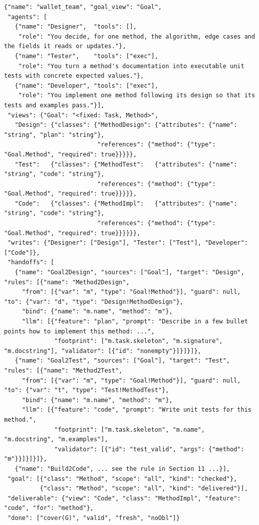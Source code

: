 \documentclass[10pt,a4paper]{article}
\newcommand{\cls}[1]{\textsf{#1}}
\begin{document}
\begin{lstlisting}[style=model, caption={Code excerpt: the admitted typed team (the builder prompt's worked example, renamed; the fixed \cls{Goal} view elided).}, label={lst:fullteam}]
{"name": "wallet_team", "goal_view": "Goal",
 "agents": [
   {"name": "Designer",  "tools": [],
    "role": "You decide, for one method, the algorithm, edge cases and the fields it reads or updates."},
   {"name": "Tester",    "tools": ["exec"],
    "role": "You turn a method's documentation into executable unit tests with concrete expected values."},
   {"name": "Developer", "tools": ["exec"],
    "role": "You implement one method following its design so that its tests and examples pass."}],
 "views": {"Goal": "<fixed: Task, Method>",
   "Design": {"classes": {"MethodDesign": {"attributes": {"name": "string", "plan": "string"},
                          "references": {"method": {"type": "Goal.Method", "required": true}}}}},
   "Test":   {"classes": {"MethodTest":   {"attributes": {"name": "string", "code": "string"},
                          "references": {"method": {"type": "Goal.Method", "required": true}}}}},
   "Code":   {"classes": {"MethodImpl":   {"attributes": {"name": "string", "code": "string"},
                          "references": {"method": {"type": "Goal.Method", "required": true}}}}}},
 "writes": {"Designer": ["Design"], "Tester": ["Test"], "Developer": ["Code"]},
 "handoffs": [
   {"name": "Goal2Design", "sources": ["Goal"], "target": "Design", "rules": [{"name": "Method2Design",
     "from": [{"var": "m", "type": "Goal!Method"}], "guard": null, "to": {"var": "d", "type": "Design!MethodDesign"},
     "bind": {"name": "m.name", "method": "m"},
     "llm": [{"feature": "plan", "prompt": "Describe in a few bullet points how to implement this method: ...",
              "footprint": ["m.task.skeleton", "m.signature", "m.docstring"], "validator": [{"id": "nonempty"}]}]}]},
   {"name": "Goal2Test", "sources": ["Goal"], "target": "Test", "rules": [{"name": "Method2Test",
     "from": [{"var": "m", "type": "Goal!Method"}], "guard": null, "to": {"var": "t", "type": "Test!MethodTest"},
     "bind": {"name": "m.name", "method": "m"},
     "llm": [{"feature": "code", "prompt": "Write unit tests for this method.",
              "footprint": ["m.task.skeleton", "m.name", "m.docstring", "m.examples"],
              "validator": [{"id": "test_valid", "args": {"method": "m"}}]}]}]},
   {"name": "Build2Code", ... see the rule in Section 11 ...}],
 "goal": [{"class": "Method", "scope": "all", "kind": "checked"},
          {"class": "Method", "scope": "all", "kind": "delivered"}],
 "deliverable": {"view": "Code", "class": "MethodImpl", "feature": "code", "for": "method"},
 "done": ["cover(G)", "valid", "fresh", "noObl"]}
\end{lstlisting}
\end{document}
